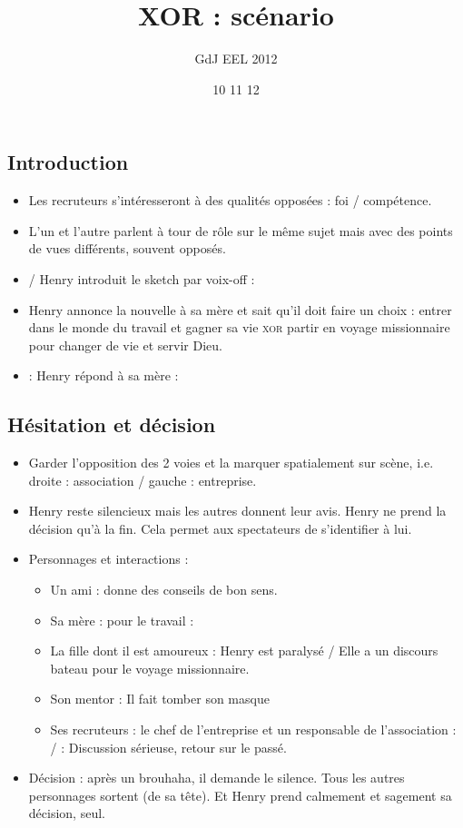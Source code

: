 \documentclass{article}
\title{XOR : scénario}
\author{GdJ EEL 2012}
\date{10 11 12}
\def\xor{\textsc{xor}}
\begin{document}
\maketitle

	\subsection{Introduction}

		\begin{itemize}
		\item \histoire{} Les recruteurs s'intéresseront à des qualités 
		opposées : foi / compétence.
		\item \mes{} L'un et l'autre parlent à tour de rôle sur le même
		sujet mais avec des points de vues différents, souvent opposés.
		\item \mes{}/\histoire{} Henry introduit le sketch par voix-off : 
		\item \histoire{} Henry annonce la nouvelle à sa mère et sait qu'il doit
		faire un choix : entrer dans le monde du travail
		et gagner sa vie \xor{} partir en voyage missionnaire pour changer 
		de vie et servir Dieu.
		\item \humour{} : Henry répond à sa mère : 
		\end{itemize}
	
	\subsection{Hésitation et décision}
	
		\begin{itemize}
		\item \mes{} Garder l'opposition des 2 voies et la marquer
		spatialement sur scène, i.e. droite : association / gauche : entreprise.
		\item \histoire{} Henry reste silencieux mais les autres donnent leur
		avis. Henry ne prend la décision qu'à la fin. Cela permet
		aux spectateurs de s'identifier à lui.
		\item Personnages et interactions :
			\begin{itemize}
			\item Un ami : \histoire{} donne des conseils de bon sens.
			\item Sa mère : \humour{} pour le travail : 
			\item La fille dont il est amoureux : \humour{}
			Henry est paralysé / Elle a un discours bateau pour le voyage
			missionnaire.
			\item Son mentor : \drama{} Il fait tomber son masque
			\item Ses recruteurs : le chef de l'entreprise et un responsable
			de l'association : \drama{}/\histoire{} : Discussion sérieuse,
			retour sur le passé.
			\end{itemize}
		\item \histoire{} Décision : après un brouhaha, il demande
		le silence. Tous les autres personnages sortent (de sa tête).
		Et Henry prend calmement et sagement sa décision, seul.
		\end{itemize}
\end{document}
